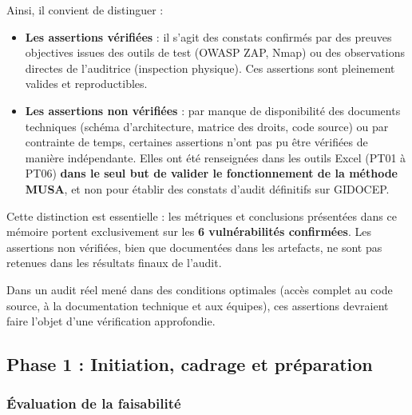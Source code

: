\documentclass[12pt,a4paper,oneside]{report}
\begin{document}
Ainsi, il convient de distinguer :

\begin{itemize}[label={\color{gold}}, leftmargin=*]
	\item \textbf{Les assertions vérifiées} : il s'agit des constats 
	confirmés par des preuves objectives issues des outils de test 
	(OWASP ZAP, Nmap) ou des observations directes de l'auditrice 
	(inspection physique). Ces assertions sont pleinement valides 
	et reproductibles.
	
	\item \textbf{Les assertions non vérifiées} : par manque de 
	disponibilité des documents techniques (schéma d'architecture, 
	matrice des droits, code source) ou par contrainte de temps, 
	certaines assertions n'ont pas pu être vérifiées de manière 
	indépendante. Elles ont été renseignées dans les outils Excel 
	(PT01 à PT06) \textbf{dans le seul but de valider le fonctionnement 
		de la méthode MUSA}, et non pour établir des constats d'audit 
	définitifs sur GIDOCEP.
\end{itemize}

Cette distinction est essentielle : les métriques et conclusions 
présentées dans ce mémoire portent exclusivement sur les \textbf{6 
	vulnérabilités confirmées}. Les assertions non vérifiées, bien que 
documentées dans les artefacts, ne sont pas retenues dans les résultats 
finaux de l'audit.

Dans un audit réel mené dans des conditions optimales (accès complet 
au code source, à la documentation technique et aux équipes), ces 
assertions devraient faire l'objet d'une vérification approfondie.
\subsection{Phase 1 : Initiation, cadrage et préparation}


\subsubsection{Évaluation de la faisabilité}

\end{document}
